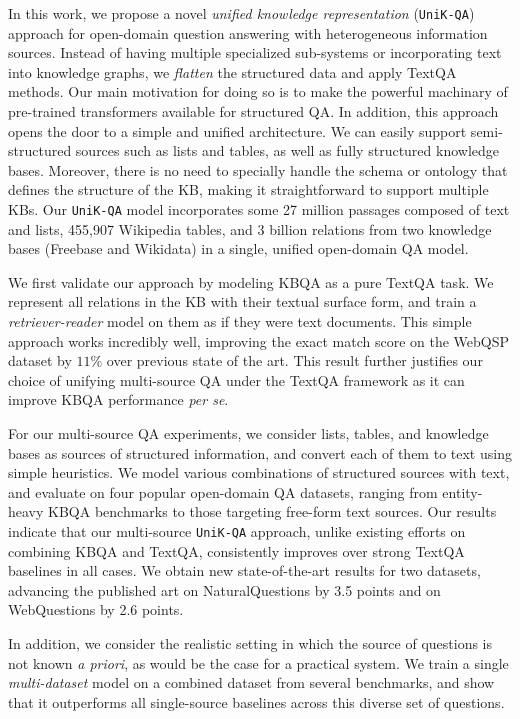 \documentclass[11pt]{article}
\newcommand{\uniqa}{\texttt{UniK-QA}\xspace}
\begin{document}
In this work, we propose a novel \emph{unified knowledge representation} (\uniqa{}) approach for open-domain question answering with heterogeneous information sources.
Instead of having multiple specialized sub-systems or incorporating text into knowledge graphs, we \textit{flatten} the structured data and apply TextQA methods.  Our main motivation for doing so is to make the powerful machinary of pre-trained transformers available for structured QA. 
In addition, this approach opens the door to a simple and unified architecture.  We can easily support semi-structured sources such as lists and tables, as well as fully structured knowledge bases.
Moreover, there is no need to specially handle the schema or ontology that defines the structure of the KB, making it straightforward to support multiple KBs.
Our \uniqa{} model incorporates some 27 million passages composed of text and lists, 455,907 Wikipedia tables, and 3 billion relations from two knowledge bases (Freebase and Wikidata) in a single, unified open-domain QA model.

We first validate our approach by modeling KBQA as a pure TextQA task.  We represent all relations in the KB with their textual surface form, and train a \emph{retriever-reader} model on them as if they were text documents.  This simple approach works incredibly well, improving the exact match score on the WebQSP dataset by $11\%$ over previous state of the art. 
This result further justifies our choice of unifying multi-source QA under the TextQA framework as it can improve KBQA performance \emph{per se}.

For our multi-source QA experiments, we consider lists, tables, and knowledge bases as sources of structured information, and convert each of them to text using simple heuristics.  We model various combinations of structured sources with text, and evaluate on four popular open-domain QA datasets, ranging from entity-heavy KBQA benchmarks to those targeting free-form text sources.
Our results indicate that our multi-source \uniqa{} approach, unlike existing efforts on combining KBQA and TextQA, consistently improves over strong TextQA baselines in all cases.
We obtain new state-of-the-art results for two datasets, advancing the published art on NaturalQuestions by 3.5 points and on WebQuestions by 2.6 points.

In addition, we consider the realistic setting in which the source of questions is not known \emph{a priori}, as would be the case for a practical system. 
We train a single \emph{multi-dataset} model on a combined dataset from several benchmarks, and show that it outperforms all single-source baselines across this diverse set of questions.
\end{document}
